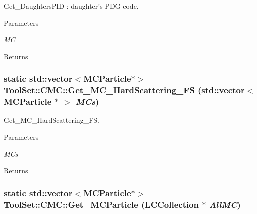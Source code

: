 Get\_\-DaughtersPID : daughter's PDG code. 
\begin{DoxyParams}{Parameters}
\item[{\em MC}]\end{DoxyParams}
\begin{DoxyReturn}{Returns}

\end{DoxyReturn}
\hypertarget{classToolSet_1_1CMC_a899d324f086d12abb75db9d87798ed91}{
\subsubsection[{Get\_\-MC\_\-HardScattering\_\-FS}]{\setlength{\rightskip}{0pt plus 5cm}static std::vector$<$MCParticle$\ast$$>$ ToolSet::CMC::Get\_\-MC\_\-HardScattering\_\-FS (std::vector$<$ MCParticle $\ast$ $>$ {\em MCs})}}
\label{classToolSet_1_1CMC_a899d324f086d12abb75db9d87798ed91}


Get\_\-MC\_\-HardScattering\_\-FS. 
\begin{DoxyParams}{Parameters}
\item[{\em MCs}]\end{DoxyParams}
\begin{DoxyReturn}{Returns}

\end{DoxyReturn}
\hypertarget{classToolSet_1_1CMC_aec3000cf58c5ef65b62938decced8303}{
\subsubsection[{Get\_\-MCParticle}]{\setlength{\rightskip}{0pt plus 5cm}static std::vector$<$MCParticle$\ast$$>$ ToolSet::CMC::Get\_\-MCParticle (LCCollection $\ast$ {\em AllMC})}}
\label{classToolSet_1_1CMC_aec3000cf58c5ef65b62938decced8303}


